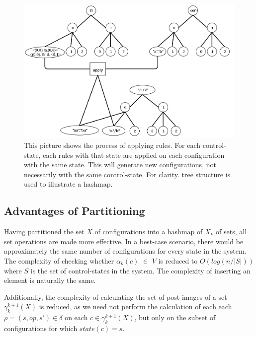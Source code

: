 \begin{figure}
\includegraphics[width=400pt] {bilder/applyrule.png}
\caption{This picture shows the process of applying rules. For each control-state, each rules with that state are applied on each configuration with the same state. This will generate new configurations, not necessarily with the same control-state. For clarity.  tree structure is used to illustrate a hashmap.}
\label{applyrule}
\end{figure}



\subsection{Advantages of Partitioning}
Having partitioned the set $X$ of configurations into a hashmap of $X_k$ of sets, all set operations are made more effective. In a best-case scenario, there would be approximately the same number of configurations for every state in the system. The complexity of checking whether $\alpha_k(c)$ $\in$ $V$ is reduced to $O(log (n/|S|))$ where $S$ is the set of control-states in the system. The complexity of inserting an element is naturally the same.

Additionally, the complexity of calculating the set of post-images of a set $\gamma_k^{k+1}(X)$ is reduced, as we need not perform the calculation of each each $\rho = (s, op, s') \in \delta$ on each $c \in \gamma_k^{k+1}(X)$, but only on the subset of configurations for which $state(c) = s$.


